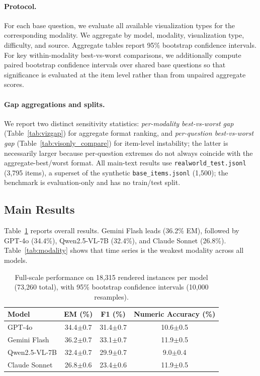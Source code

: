 \documentclass{article}
\begin{document}
\paragraph{Protocol.}
For each base question, we evaluate all available visualization types for the corresponding modality. We aggregate by model, modality, visualization type, difficulty, and source. Aggregate tables report 95\% bootstrap confidence intervals. For key within-modality best-vs-worst comparisons, we additionally compute paired bootstrap confidence intervals over shared base questions so that significance is evaluated at the item level rather than from unpaired aggregate scores.

\paragraph{Gap aggregations and splits.}
We report two distinct sensitivity statistics: \emph{per-modality best-vs-worst gap}
(Table~\ref{tab:vizgap}) for aggregate format ranking, and \emph{per-question
best-vs-worst gap} (Table~\ref{tab:visonly_compare}) for item-level instability;
the latter is necessarily larger because per-question extremes do not always
coincide with the aggregate-best/worst format. All main-text results use
\texttt{realworld\_test.jsonl} (3{,}795 items), a superset of the synthetic
\texttt{base\_items.jsonl} (1{,}500); the benchmark is evaluation-only and has
no train/test split.

\subsection{Main Results}
Table~\ref{tab:overall} reports overall results. Gemini Flash leads (36.2\% EM), followed by GPT-4o (34.4\%), Qwen2.5-VL-7B (32.4\%), and Claude Sonnet (26.8\%). Table~\ref{tab:modality} shows that time series is the weakest modality across all models.

\begin{table}[t]
\centering
\small
\caption{Full-scale performance on 18,315 rendered instances per model (73,260 total), with 95\% bootstrap confidence intervals (10,000 resamples).}
\label{tab:overall}
\begin{tabular}{lccc}
\toprule
Model & EM (\%) & F1 (\%) & Numeric Accuracy (\%) \\
\midrule
GPT-4o & 34.4{\small$\pm$0.7} & 31.4{\small$\pm$0.7} & 10.6{\small$\pm$0.5} \\
Gemini Flash & 36.2{\small$\pm$0.7} & 33.1{\small$\pm$0.7} & 11.9{\small$\pm$0.5} \\
Qwen2.5-VL-7B & 32.4{\small$\pm$0.7} & 29.9{\small$\pm$0.7} & 9.0{\small$\pm$0.4} \\
Claude Sonnet & 26.8{\small$\pm$0.6} & 23.4{\small$\pm$0.6} & 11.9{\small$\pm$0.5} \\
\bottomrule
\end{tabular}
\end{table}
\end{document}
